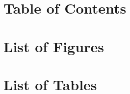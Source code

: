 \documentclass[a4paper,11pt]{article}
\begin{document}





\clearpage
\setcounter{tocdepth}{2}
\section*{Table of Contents}
\ifdefined\XeTeXversion\renewcommand{\contentsname}{}\tableofcontents\fi

\section*{List of Figures}
\ifdefined\XeTeXversion\renewcommand{\listfigurename}{}\listoffigures\fi

\section*{List of Tables}
\ifdefined\XeTeXversion\renewcommand{\listtablename}{}\listoftables\fi
\clearpage



\clearpage

\end{document}
